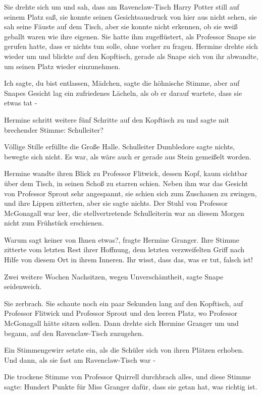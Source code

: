 Sie drehte sich um und sah, dass am Ravenclaw-Tisch Harry Potter still auf
seinem Platz saß, sie konnte seinen Gesichtsausdruck von hier aus nicht sehen,
sie sah seine Fäuste auf dem Tisch, aber sie konnte nicht erkennen, ob sie weiß
geballt waren wie ihre eigenen. Sie hatte ihm zugeflüstert, als Professor Snape
sie gerufen hatte, dass er nichts tun solle, ohne vorher zu fragen. Hermine
drehte sich wieder um und blickte auf den Kopftisch, gerade als Snape sich von
ihr abwandte, um seinen Platz wieder einzunehmen.

\glqq Ich sagte, du bist entlassen, Mädchen\grqq{}, sagte die höhnische Stimme,
aber auf Snapes Gesicht lag ein zufriedenes Lächeln, als ob er darauf wartete,
dass sie etwas tat -

Hermine schritt weitere fünf Schritte auf den Kopftisch zu und sagte mit
brechender Stimme: \glqq Schulleiter?\grqq{}

Völlige Stille erfüllte die Große Halle. Schulleiter Dumbledore sagte nichts,
bewegte sich nicht. Es war, als wäre auch er gerade aus Stein gemeißelt worden.

Hermine wandte ihren Blick zu Professor Flitwick, dessen Kopf, kaum sichtbar
über dem Tisch, in seinen Schoß zu starren schien. Neben ihm war das Gesicht von
Professor Sprout sehr angespannt, sie schien sich zum Zuschauen zu zwingen, und
ihre Lippen zitterten, aber sie sagte nichts. Der Stuhl von Professor McGonagall
war leer, die stellvertretende Schulleiterin war an diesem Morgen nicht zum
Frühstück erschienen.

\glqq Warum sagt keiner von Ihnen etwas?\grqq{}, fragte Hermine Granger. Ihre
Stimme zitterte vom letzten Rest ihrer Hoffnung, dem letzten verzweifelten Griff
nach Hilfe von diesem Ort in ihrem Inneren. \glqq Ihr wisst, dass das, was er
tut, falsch ist!\grqq{}

\glqq Zwei weitere Wochen Nachsitzen, wegen Unverschämtheit\grqq{}, sagte Snape
seidenweich.

Sie zerbrach. Sie schaute noch ein paar Sekunden lang auf den Kopftisch, auf
Professor Flitwick und Professor Sprout und den leeren Platz, wo Professor
McGonagall hätte sitzen sollen. Dann drehte sich Hermine Granger um und begann,
auf den Ravenclaw-Tisch zuzugehen.

Ein Stimmengewirr setzte ein, als die Schüler sich von ihren Plätzen erhoben.
Und dann, als sie fast am Ravenclaw-Tisch war -

Die trockene Stimme von Professor Quirrell durchbrach alles, und diese Stimme
sagte: \glqq Hundert Punkte für Miss Granger dafür, dass sie getan hat, was
richtig ist.\grqq{}

